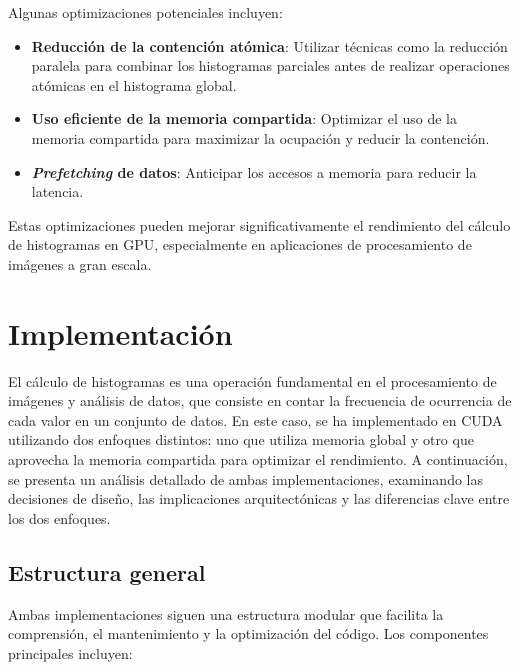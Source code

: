             Algunas optimizaciones potenciales incluyen:
            
            \begin{itemize}
            
                \item \textbf{Reducción de la contención atómica}: Utilizar técnicas como la reducción paralela para combinar los histogramas parciales antes de realizar operaciones atómicas en el histograma global.
                
                \item \textbf{Uso eficiente de la memoria compartida}: Optimizar el uso de la memoria compartida para maximizar la ocupación y reducir la contención.
                
                \item \textbf{\textit{Prefetching} de datos}: Anticipar los accesos a memoria para reducir la latencia.
                
            \end{itemize}
    
            Estas optimizaciones pueden mejorar significativamente el rendimiento del cálculo de histogramas en GPU, especialmente en aplicaciones de procesamiento de imágenes a gran escala.

\newpage

\section{Implementación}

    El cálculo de histogramas es una operación fundamental en el procesamiento de imágenes y análisis de datos, que consiste en contar la frecuencia de ocurrencia de cada valor en un conjunto de datos. En este caso, se ha implementado en CUDA utilizando dos enfoques distintos: uno que utiliza memoria global y otro que aprovecha la memoria compartida para optimizar el rendimiento. A continuación, se presenta un análisis detallado de ambas implementaciones, examinando las decisiones de diseño, las implicaciones arquitectónicas y las diferencias clave entre los dos enfoques.

    \subsection{Estructura general}
    
        Ambas implementaciones siguen una estructura modular que facilita la comprensión, el mantenimiento y la optimización del código. Los componentes principales incluyen:
        
